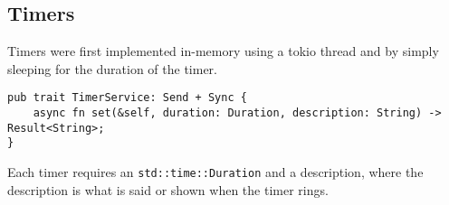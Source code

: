 \subsection{Timers}
Timers were first implemented in-memory using a tokio thread and by simply sleeping for the duration of the timer.

\begin{verbatim}
pub trait TimerService: Send + Sync {
    async fn set(&self, duration: Duration, description: String) -> Result<String>;
}
\end{verbatim}

Each timer requires an \texttt{std::time::Duration} and a description, where the description is what is said or shown when the timer rings.
